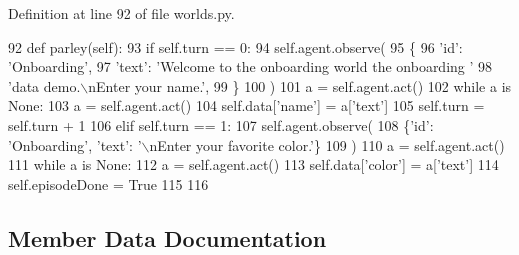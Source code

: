 Definition at line 92 of file worlds.\+py.


\begin{DoxyCode}
92     \textcolor{keyword}{def }parley(self):
93         \textcolor{keywordflow}{if} self.turn == 0:
94             self.agent.observe(
95                 \{
96                     \textcolor{stringliteral}{'id'}: \textcolor{stringliteral}{'Onboarding'},
97                     \textcolor{stringliteral}{'text'}: \textcolor{stringliteral}{'Welcome to the onboarding world the onboarding '}
98                     \textcolor{stringliteral}{'data demo.\(\backslash\)nEnter your name.'},
99                 \}
100             )
101             a = self.agent.act()
102             \textcolor{keywordflow}{while} a \textcolor{keywordflow}{is} \textcolor{keywordtype}{None}:
103                 a = self.agent.act()
104             self.data[\textcolor{stringliteral}{'name'}] = a[\textcolor{stringliteral}{'text'}]
105             self.turn = self.turn + 1
106         \textcolor{keywordflow}{elif} self.turn == 1:
107             self.agent.observe(
108                 \{\textcolor{stringliteral}{'id'}: \textcolor{stringliteral}{'Onboarding'}, \textcolor{stringliteral}{'text'}: \textcolor{stringliteral}{'\(\backslash\)nEnter your favorite color.'}\}
109             )
110             a = self.agent.act()
111             \textcolor{keywordflow}{while} a \textcolor{keywordflow}{is} \textcolor{keywordtype}{None}:
112                 a = self.agent.act()
113             self.data[\textcolor{stringliteral}{'color'}] = a[\textcolor{stringliteral}{'text'}]
114             self.episodeDone = \textcolor{keyword}{True}
115 
116 
\end{DoxyCode}


\subsection{Member Data Documentation}
\mbox{\label{classparlai_1_1chat__service_1_1tasks_1_1overworld__demo_1_1worlds_1_1MessengerOnboardDataOnboardWorld_af0fb55796b4297b23a3f854b2cf07238}} 
